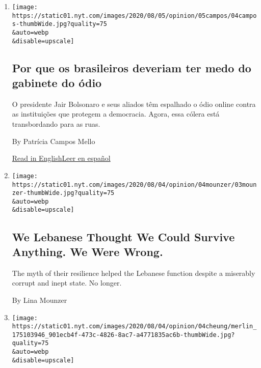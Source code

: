 \begin{enumerate}
\def\labelenumi{\arabic{enumi}.}
\item
  \href{/pt/2020/08/04/opinion/international-world/bolsonaro-gabinete-do-odio.html}{}

  \texttt{[image: https://static01.nyt.com/images/2020/08/05/opinion/05campos/04campos-thumbWide.jpg?quality=75\\\&auto=webp\\\&disable=upscale]}

  \hypertarget{por-que-os-brasileiros-deveriam-ter-medo-do-gabinete-do-uxf3dio}{%
  \subsection{Por que os brasileiros deveriam ter medo do gabinete do
  ódio}\label{por-que-os-brasileiros-deveriam-ter-medo-do-gabinete-do-uxf3dio}}

  O presidente Jair Bolsonaro e seus aliados têm espalhado o ódio online
  contra as instituições que protegem a democracia. Agora, essa cólera
  está transbordando para as ruas.

  By Patrícia Campos Mello

  \href{https://www.nytimes.com/2020/08/04/opinion/bolsonaro-office-of-hate-brazil.html}{Read
  in
  English}\href{https://www.nytimes.com/es/2020/08/04/espanol/opinion/bolsonaro-oficina-odio-brasil.html}{Leer
  en español}
\item
  \href{/2020/08/03/opinion/lebanon-coronavirus-economy.html}{}

  \texttt{[image: https://static01.nyt.com/images/2020/08/04/opinion/04mounzer/03mounzer-thumbWide.jpg?quality=75\\\&auto=webp\\\&disable=upscale]}

  \hypertarget{we-lebanese-thought-we-could-survive-anything-we-were-wrong}{%
  \subsection{We Lebanese Thought We Could Survive Anything. We Were
  Wrong.}\label{we-lebanese-thought-we-could-survive-anything-we-were-wrong}}

  The myth of their resilience helped the Lebanese function despite a
  miserably corrupt and inept state. No longer.

  By Lina Mounzer
\item
  \href{/2020/08/02/opinion/hong-kong-election-china.html}{}

  \texttt{[image: https://static01.nyt.com/images/2020/08/04/opinion/04cheung/merlin\_175103946\_901ecb4f-473c-4826-8ac7-a4771835ac6b-thumbWide.jpg?quality=75\\\&auto=webp\\\&disable=upscale]}


\end{enumerate}
